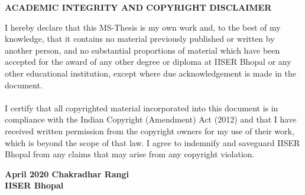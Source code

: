     \newpage
    \begin{center}
        \LARGE{\textbf{\uppercase{ACADEMIC INTEGRITY AND COPYRIGHT DISCLAIMER}}}
    \end{center}
    \vspace{2cm}
      I hereby  declare  that  this  MS-Thesis  is  my  own  work  and,  to  the  best  of  my knowledge,  that  it  contains  no  material  previously published  or  written  by  another person,  and  no  substantial  proportions  of  material which  have  been  accepted  for  the award  of  any  other  degree  or  diploma  at  IISER  Bhopal  or  any  other  educational institution, except where due acknowledgement is made in the document. \\ \\
      I  certify  that  all  copyrighted  material  incorporated  into  this  document  is  in compliance  with  the  Indian  Copyright  (Amendment)  Act  (2012)  and  that  I  have received  written  permission  from  the  copyright  owners  for  my  use  of  their  work, which  is  beyond  the  scope  of  that  law.  I  agree  to  indemnify  and  saveguard  IISER Bhopal from any claims that may arise from any copyright violation. 
      
      \vfill 
      
      \noindent\textbf{April 2020 \hfill Chakradhar Rangi
    \\ IISER Bhopal}
    
